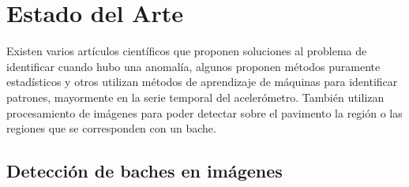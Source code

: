 \chapter{Estado del Arte}\label{chapter:state-of-the-art}

Existen varios artículos científicos que proponen soluciones al problema de identificar cuando hubo una anomalía, algunos proponen métodos
puramente estadísticos y otros utilizan métodos de aprendizaje de máquinas para identificar patrones, mayormente en la serie temporal del
acelerómetro. También utilizan procesamiento de imágenes para poder detectar sobre el pavimento la región o las regiones que se corresponden
con un bache.

\section{Detección de baches en imágenes}

